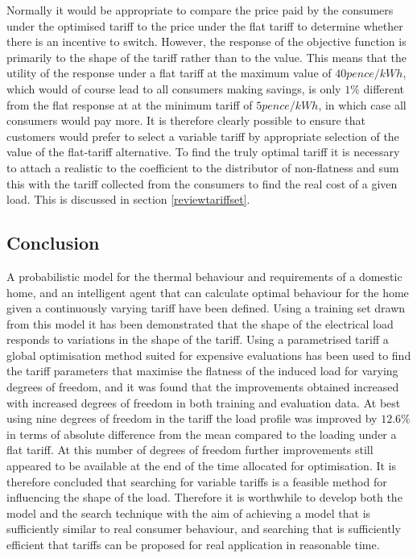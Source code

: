 \documentclass[a4paper, 10 pt, conference]{ieeeconf}  %
\begin{document}
Normally it would be appropriate to compare the price paid by the consumers under the optimised tariff to the price under the flat tariff to determine whether there is an incentive to switch. However, the response of the objective function is primarily to the shape of the tariff rather than to the value. This means that the utility of the response under a flat tariff at the maximum value of $40 pence /kWh$, which would of course lead to all consumers making savings, is only $1\%$ different from the flat response at at the minimum tariff of $5 pence /kWh$, in which case all consumers would pay more. It is therefore clearly possible to ensure that customers would prefer to select a variable tariff by appropriate selection of the value of the flat-tariff alternative. To find the truly optimal tariff it is necessary to attach a realistic to the coefficient to the distributor of non-flatness and sum this with the tariff collected from the consumers to find the real cost of a given load. This is discussed in section \ref{reviewtariffset}.

\subsection{Conclusion}
A probabilistic model for the thermal behaviour and requirements of a domestic home, and an intelligent agent that can calculate optimal behaviour for the home given a continuously varying tariff have been defined. Using a training set drawn from this model it has been demonstrated that the shape of the electrical load responds to variations in the shape of the tariff. Using a parametrised tariff a global optimisation method suited for expensive evaluations has been used to find the tariff parameters that maximise the flatness of the induced load for varying degrees of freedom, and it was found that the improvements obtained increased with increased degrees of freedom in both training and evaluation data. At best using nine degrees of freedom in the tariff the load profile was improved by $12.6\%$ in terms of absolute difference from the mean compared to the loading under a flat tariff. At this number of degrees of freedom further improvements still appeared to be available at the end of the time allocated for optimisation. It is therefore concluded that searching for variable tariffs is a feasible method for influencing the shape of the load. Therefore it is worthwhile to develop both the model and the search technique with the aim of achieving a model that is sufficiently similar to real consumer behaviour, and searching that is sufficiently efficient that tariffs can be proposed for real application in reasonable time. 
\end{document}
